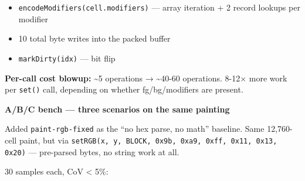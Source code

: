 \begin{itemize}
\item
  \texttt{e\allowbreak{}n\allowbreak{}c\allowbreak{}o\allowbreak{}d\allowbreak{}e\allowbreak{}M\allowbreak{}o\allowbreak{}d\allowbreak{}i\allowbreak{}f\allowbreak{}i\allowbreak{}e\allowbreak{}r\allowbreak{}s\allowbreak{}(\allowbreak{}c\allowbreak{}e\allowbreak{}l\allowbreak{}l\allowbreak{}.\allowbreak{}m\allowbreak{}o\allowbreak{}d\allowbreak{}i\allowbreak{}f\allowbreak{}i\allowbreak{}e\allowbreak{}r\allowbreak{}s\allowbreak{})} --- array iteration + 2 record lookups per modifier
\item
  10 total byte writes into the packed buffer
\item
  \texttt{m\allowbreak{}a\allowbreak{}r\allowbreak{}k\allowbreak{}D\allowbreak{}i\allowbreak{}r\allowbreak{}t\allowbreak{}y\allowbreak{}(\allowbreak{}i\allowbreak{}d\allowbreak{}x\allowbreak{})} --- bit flip
\end{itemize}

\textbf{Per-call cost blowup:} \textasciitilde5 operations → \textasciitilde40-60 operations. 8-12× more work per \texttt{s\allowbreak{}e\allowbreak{}t\allowbreak{}(\allowbreak{})} call, depending on whether fg/bg/modifiers are present.

\textbf{A/B/C bench --- three scenarios on the same painting}

Added \texttt{p\allowbreak{}a\allowbreak{}i\allowbreak{}n\allowbreak{}t\allowbreak{}-\allowbreak{}r\allowbreak{}g\allowbreak{}b\allowbreak{}-\allowbreak{}f\allowbreak{}i\allowbreak{}x\allowbreak{}e\allowbreak{}d} as the ``no hex parse, no math'' baseline. Same 12,760-cell paint, but via \texttt{s\allowbreak{}e\allowbreak{}t\allowbreak{}R\allowbreak{}G\allowbreak{}B\allowbreak{}(\allowbreak{}x\allowbreak{},\allowbreak{} \allowbreak{}y\allowbreak{},\allowbreak{} \allowbreak{}B\allowbreak{}L\allowbreak{}O\allowbreak{}C\allowbreak{}K\allowbreak{},\allowbreak{} \allowbreak{}0\allowbreak{}x\allowbreak{}9\allowbreak{}b\allowbreak{},\allowbreak{} \allowbreak{}0\allowbreak{}x\allowbreak{}a\allowbreak{}9\allowbreak{},\allowbreak{} \allowbreak{}0\allowbreak{}x\allowbreak{}f\allowbreak{}f\allowbreak{},\allowbreak{} \allowbreak{}0\allowbreak{}x\allowbreak{}1\allowbreak{}1\allowbreak{},\allowbreak{} \allowbreak{}0\allowbreak{}x\allowbreak{}1\allowbreak{}3\allowbreak{},\allowbreak{} \allowbreak{}0\allowbreak{}x\allowbreak{}2\allowbreak{}0\allowbreak{})} --- pre-parsed bytes, no string work at all.

30 samples each, CoV \textless{} 5\%:



